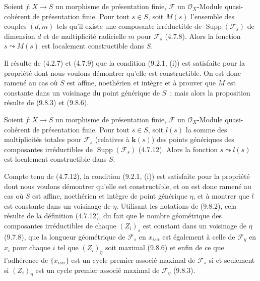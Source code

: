 
\begin{corollary}[9.8.7]
\label{IV.9.8.7-fr}
Soient $f:X\to S$ un morphisme de présentation finie, $\mathcal F$ un
$\mathcal O_X$-Module quasi-cohérent de présentation finie. Pour tout $s\in S$,
soit $M(s)$ l'ensemble des couples $(d,m)$ tels qu'il existe une composante
irréductible de $\operatorname{Supp}(\mathcal F_s)$ de dimension $d$ et de
multiplicité radicielle $m$ pour $\mathcal F_s$ \textup{(4.7.8)}. Alors la fonction
$s\leadsto M(s)$ est localement constructible dans $S$.
\end{corollary}

Il résulte de (4.2.7) et (4.7.9) que la condition (9.2.1, (i)) est satisfaite
pour la propriété dont nous voulons démontrer qu'elle est constructible. On est
donc ramené au cas où $S$ est affine, noethérien et intègre et à prouver que $M$
est constante dans un voisinage du point générique de $S$~; mais alors la
proposition résulte de (9.8.3) et (9.8.6).

\begin{proposition}[9.8.8]
\label{IV.9.8.8-fr}
Soient $f:X\to S$ un morphisme de présentation finie, $\mathcal F$ un
$\mathcal O_X$-Module quasi-cohérent de présentation finie. Pour tout $s\in S$,
soit $l(s)$ la somme des multiplicités totales pour $\mathcal F_s$ (relatives à
$\boldsymbol{k}(s)$) des points génériques des composantes irréductibles de
$\operatorname{Supp}(\mathcal F_s)$ \textup{(4.7.12)}. Alors la fonction $s\leadsto l(s)$
est localement constructible dans $S$.
\end{proposition}

Compte tenu de (4.7.12), la condition (9.2.1, (i)) est satisfaite pour la
propriété dont nous voulons démontrer qu'elle est constructible, et on est donc
ramené au cas où $S$ est affine, noethérien et intègre de point générique
$\eta$, et à montrer que $l$ est constante dans un voisinage de $\eta$.
Utilisant les notations de (9.8.2), cela résulte de la définition (4.7.12), du
fait que le nombre géométrique des composantes irréductibles de chaque
$(Z_i)_s$ est constant dans un voisinage de $\eta$ (9.7.8), que la longueur
géométrique de $\mathcal F_s$ en $x_{is\alpha}$ est également à celle de
$\mathcal F_\eta$ en $x_i$ pour chaque $i$ tel que $(Z_i)_\eta$ soit maximal
(9.8.6) et enfin de ce que l'adhérence de $\{x_{is\alpha}\}$ est un cycle
premier associé maximal de $\mathcal F_s$ si et seulement si $(Z_i)_\eta$ est
un cycle premier associé maximal de $\mathcal F_\eta$ (9.8.3).

